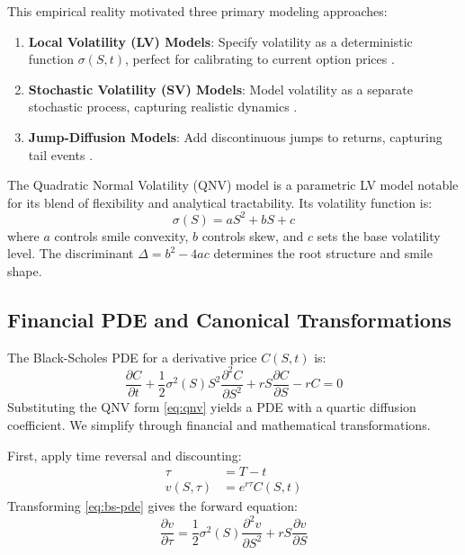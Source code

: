 \documentclass[a4paper,11pt]{article}
\begin{document}
This empirical reality motivated three primary modeling approaches:
\begin{enumerate}
    \item \textbf{Local Volatility (LV) Models}: Specify volatility as a deterministic function $\sigma(S,t)$, perfect for calibrating to current option prices \cite{Dupire1994, DermanKani1994}.
    \item \textbf{Stochastic Volatility (SV) Models}: Model volatility as a separate stochastic process, capturing realistic dynamics \cite{Heston1993}.
    \item \textbf{Jump-Diffusion Models}: Add discontinuous jumps to returns, capturing tail events \cite{Merton1976}.
\end{enumerate}

The Quadratic Normal Volatility (QNV) model is a parametric LV model notable for its blend of flexibility and analytical tractability. Its volatility function is:
\begin{equation}
\sigma(S) = aS^2 + bS + c
\label{eq:qnv}
\end{equation}
where $a$ controls smile convexity, $b$ controls skew, and $c$ sets the base volatility level. The discriminant $\Delta = b^2 - 4ac$ determines the root structure and smile shape.

\subsection{Financial PDE and Canonical Transformations}

The Black-Scholes PDE for a derivative price $C(S,t)$ is:
\begin{equation}
\frac{\partial C}{\partial t} + \frac{1}{2}\sigma^2(S)S^2\frac{\partial^2 C}{\partial S^2} + rS\frac{\partial C}{\partial S} - rC = 0
\label{eq:bs-pde}
\end{equation}
Substituting the QNV form \eqref{eq:qnv} yields a PDE with a quartic diffusion coefficient. We simplify through financial and mathematical transformations.

First, apply time reversal and discounting:
\begin{align}
\tau &= T - t \\
v(S, \tau) &= e^{r\tau} C(S, t)
\label{eq:time-discount}
\end{align}
Transforming \eqref{eq:bs-pde} gives the forward equation:
\begin{equation}
\frac{\partial v}{\partial \tau} = \frac{1}{2}\sigma^2(S)\frac{\partial^2 v}{\partial S^2} + rS\frac{\partial v}{\partial S}
\label{eq:forward-pde}
\end{equation}
\end{document}
